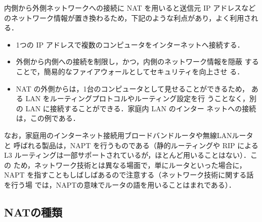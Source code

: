 内側から外側ネットワークへの接続に NAT を用いると送信元 IP アドレスなど
のネットワーク情報が置き換わるため，下記のような利点があり，よく利用され
る．

\begin{itemize}
 \item 1つの IP アドレスで複数のコンピュータをインターネットへ接続する．
 \item 外側から内側への接続を制限し，かつ，内側のネットワーク情報を隠蔽
       することで，簡易的なファイアウォールとしてセキュリティを向上させ
       る．
 \item NAT の外側からは，1台のコンピュータとして見せることができるため，
       ある LAN をルーティングプロトコルやルーティング設定を行
       うことなく，別の LAN に接続することができる．家庭内 LAN のインター
       ネットへの接続は，この例である．
\end{itemize}

なお，家庭用のインターネット接続用ブロードバンドルータや無線LANルータと
呼ばれる製品は，NAPT を行うものである（静的ルーティングや RIP による L3 
ルーティングは一部サポートされているが，ほとんど用いることはない）．この
ため，ネットワーク技術とは異なる場面で，単にルータといった場合に，NAPT 
を指すこともしばしばあるので注意する（ネットワーク技術に関する話を行う場
では，NAPTの意味でルータの語を用いることはまれである）．

\subsection*{NATの種類}

